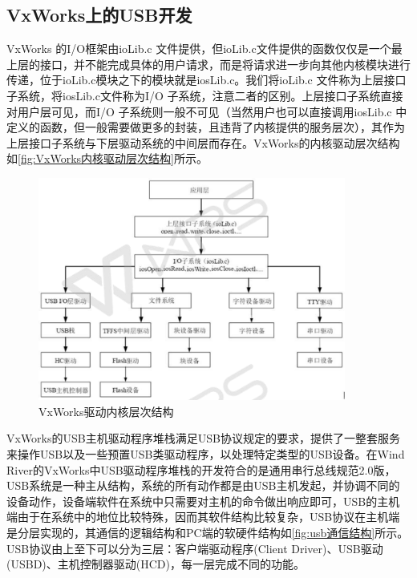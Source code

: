 \subsection{VxWorks上的USB开发}
	VxWorks 的I/O框架由ioLib.c 文件提供，但ioLib.c文件提供的函数仅仅是一个最上层的接口，并不能完成具体的用户请求，而是将请求进一步向其他内核模块进行传递，位于ioLib.c模块之下的模块就是iosLib.c。我们将ioLib.c 文件称为上层接口子系统，将iosLib.c文件称为I/O 子系统，注意二者的区别。上层接口子系统直接对用户层可见，而I/O 子系统则一般不可见（当然用户也可以直接调用iosLib.c 中定义的函数，但一般需要做更多的封装，且违背了内核提供的服务层次），其作为上层接口子系统与下层驱动系统的中间层而存在。VxWorks的内核驱动层次结构如\autoref{fig:VxWorks内核驱动层次结构}所示。

\begin{figure}[!h]
\centering
\includegraphics[width=0.9\textwidth]{./graphics/vxworks-kernel-diagram.pdf}
\caption{VxWorks驱动内核层次结构}\label{fig:VxWorks内核驱动层次结构}
\end{figure}	
			
	VxWorks的USB主机驱动程序堆栈满足USB协议规定的要求，提供了一整套服务来操作USB以及一些预置USB类驱动程序，以处理特定类型的USB设备。在Wind River的VxWorks中USB驱动程序堆栈的开发符合的是通用串行总线规范2.0版，USB系统是一种主从结构，系统的所有动作都是由USB主机发起，并协调不同的设备动作，设备端软件在系统中只需要对主机的命令做出响应即可，USB的主机端由于在系统中的地位比较特殊，因而其软件结构比较复杂，USB协议在主机端是分层实现的，其通信的逻辑结构和PC端的软硬件结构如\autoref{fig:usb通信结构}所示。USB协议由上至下可以分为三层：客户端驱动程序(Client Driver)、USB驱动(USBD)、主机控制器驱动(HCD)，每一层完成不同的功能。

